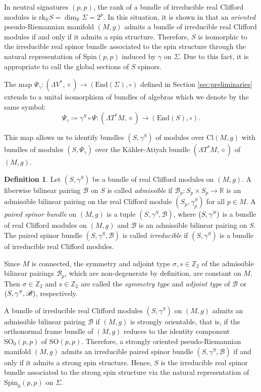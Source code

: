 \documentclass[10pt,reqno]{amsart}
\theoremstyle{definition}
\newtheorem{definition}[theorem]{Definition}
\theoremstyle{remark}
\newcommand{\Z}{\mathbb{Z}}
\newcommand{\R}{\mathbb{R}}
\newcommand{\rk}{\mathrm{rk}}
\newcommand{\End}{\mathrm{End}}
\begin{document}
In neutral signatures $(p,p)$, the rank of a bundle of irreducible real Clifford modules is $\rk_\R S=\dim_\R\Sigma=2^p$. In this situation, it is shown in \cite{Lazaroiu_Shahbazi2019} that an \emph{oriented} pseudo-Riemannian manifold $(M,g)$ admits a bundle of irreducible real Clifford modules if and only if it admits a spin structure. Therefore, $S$ is isomorphic to the irreducible real spinor bundle associated to the spin structure through the natural representation of $\mathrm{Spin}(p,p)$ induced by $\gamma$ on $\Sigma$. Due to this fact, it is appropriate to call the global sections of $S$ spinors.\medskip

The map $\Psi_\gamma\colon(\Lambda V^*,\diamond)\to(\End(\Sigma),\circ)$ defined in Section \ref{sec:preliminaries} extends to a unital isomorphism of bundles of algebras which we denote by the same symbol: $$\Psi_\gamma\coloneqq\gamma^S\circ\Psi\colon(\Lambda T^*M,\diamond)\to(\End(S),\circ).$$

This map allows us to identify bundles $(S,\gamma^S)$ of modules over $\mathrm{Cl}(M,g)$ with bundles of modules $(S,\Psi_\gamma)$ over the Kähler-Atiyah bundle $(\Lambda T^*M,\diamond)$ of $(M,g)$.

\begin{definition}
    Let $(S,\gamma^S)$ be a bundle of real Clifford modules on $(M,g)$. A fiberwise bilinear pairing $\mathscr{B}$ on $S$ is called \emph{admissible} if $\mathscr{B}_p\colon S_p\times S_p\to\R$ is an admissible bilinear pairing on the real Clifford module $(S_p,\gamma^S_p)$ for all $p\in M$. A \emph{paired spinor bundle} on $(M,g)$ is a tuple $(S,\gamma^S,\mathscr{B})$, where $(S,\gamma^{\smash{S}})$ is a bundle of real Clifford modules on $(M,g)$ and $\mathscr{B}$ is an admissible bilinear pairing on $S$. The paired spinor bundle $(S,\gamma^S,\mathscr{B})$ is called \emph{irreducible} if $(S,\gamma^S)$ is a bundle of irreducible real Clifford modules.
\end{definition}

Since $M$ is connected, the symmetry and adjoint type $\sigma,s\in\Z_2$ of the admissible bilinear pairings $\mathscr{B}_p$, which are non-degenerate by definition, are constant on $M$. Then $\sigma\in\Z_2$ and $s\in\Z_2$ are called the \emph{symmetry type} and \emph{adjoint type} of $\mathscr{B}$ or $(S,\gamma^{\smash{S}},\mathscr{B})$, respectively.\medskip

A bundle of irreducible real Clifford modules $(S,\gamma^S)$ on $(M,g)$ admits an admissible bilinear pairing $\mathscr{B}$ if $(M,g)$ is strongly orientable, that is, if the orthonormal frame bundle of $(M,g)$ reduces to the identity component $\mathrm{SO}_0(p,p)$ of $\mathrm{SO}(p,p)$. Therefore, a strongly oriented pseudo-Riemannian manifold $(M,g)$ admits an irreducible paired spinor bundle $(S,\gamma^S,\mathscr{B})$ if and only if it admits a strong spin structure. Hence, $S$ is the irreducible real spinor bundle associated to the strong spin structure via the natural representation of $\mathrm{Spin}_0(p,p)$ on $\Sigma$.
\end{document}

